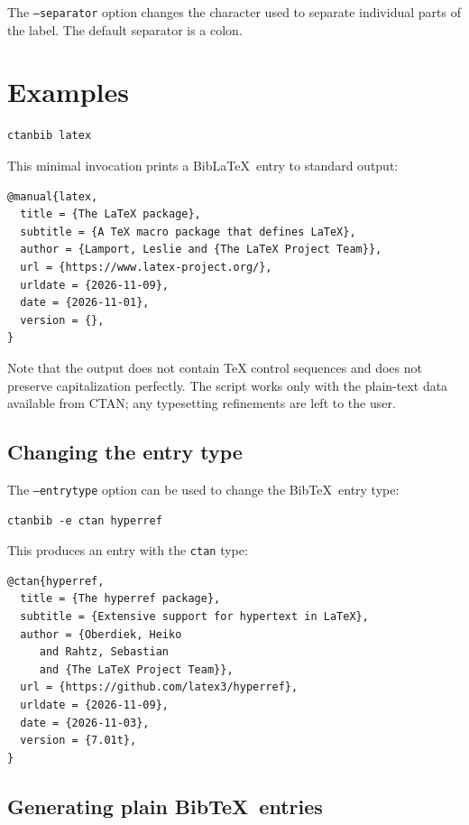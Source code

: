 \documentclass[11pt]{ltxdoc}
\begin{document}
The \texttt{--separator} option changes the character used to separate
individual parts of the label. The default separator is a colon.

\section{Examples}

\begin{verbatim}
ctanbib latex
\end{verbatim}

\noindent This minimal invocation prints a Bib\LaTeX\ entry to standard
output:

\begin{verbatim}
@manual{latex,
  title = {The LaTeX package},
  subtitle = {A TeX macro package that defines LaTeX},
  author = {Lamport, Leslie and {The LaTeX Project Team}},
  url = {https://www.latex-project.org/},
  urldate = {2026-11-09},
  date = {2026-11-01},
  version = {},
}
\end{verbatim}

\noindent Note that the output does not contain TeX control sequences and
does not preserve capitalization perfectly. The script works only with
the plain-text data available from CTAN; any typesetting refinements are
left to the user.

\subsection{Changing the entry type}

The \texttt{--entrytype} option can be used to change the Bib\TeX\ entry
type:

\begin{verbatim}
ctanbib -e ctan hyperref
\end{verbatim}

\noindent This produces an entry with the \texttt{ctan} type:

\begin{verbatim}
@ctan{hyperref,
  title = {The hyperref package},
  subtitle = {Extensive support for hypertext in LaTeX},
  author = {Oberdiek, Heiko
     and Rahtz, Sebastian
     and {The LaTeX Project Team}},
  url = {https://github.com/latex3/hyperref},
  urldate = {2026-11-09},
  date = {2026-11-03},
  version = {7.01t},
}
\end{verbatim}

\subsection{Generating plain Bib\TeX\ entries}
\end{document}
